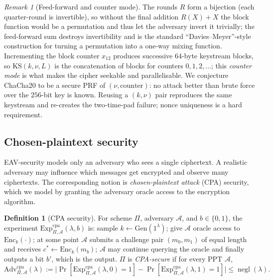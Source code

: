 \documentclass[11pt,a4paper]{article}
\theoremstyle{definition}
\newtheorem{definition}[theorem]{Definition}
\theoremstyle{remark}
\newtheorem{remark}[theorem]{Remark}
\DeclareMathOperator{\negl}{negl}
\begin{document}
\begin{remark}[Feed-forward and counter mode]\label{symmetric:rem-chacha-design}
The rounds \(R\) form a bijection (each quarter-round is invertible), so without the final addition \(R(X) + X\) the block function would be a permutation and thus let the adversary invert it trivially; the feed-forward sum destroys invertibility and is the standard ``Davies--Meyer''-style construction for turning a permutation into a one-way mixing function. Incrementing the block counter \(x_{12}\) produces successive \(64\)-byte keystream blocks, so \(\mathrm{KS}(k,\nu,L)\) is the concatenation of blocks for counters \(0, 1, 2, \dots\); this \emph{counter mode} is what makes the cipher seekable and parallelisable. We conjecture \textsf{ChaCha20} to be a secure PRF of \((\nu, \text{counter})\): no attack better than brute force over the \(256\)-bit key is known. Reusing a \((k,\nu)\) pair reproduces the same keystream and re-creates the two-time-pad failure; nonce uniqueness is a hard requirement.
\end{remark}

\subsection{Chosen-plaintext security}

EAV-security models only an adversary who sees a single ciphertext. A realistic adversary may influence which messages get encrypted and observe many ciphertexts. The corresponding notion is \emph{chosen-plaintext attack} (CPA) security, which we model by granting the adversary oracle access to the encryption algorithm.

\begin{definition}[CPA security]\label{symmetric:def-cpa}
For scheme \(\Pi\), adversary \(\mathcal{A}\), and \(b \in \{0,1\}\), the experiment \(\mathrm{Exp}^{\mathrm{cpa}}_{\Pi,\mathcal{A}}(\lambda,b)\) is: sample \(k \leftarrow \mathrm{Gen}(1^\lambda)\); give \(\mathcal{A}\) oracle access to \(\mathrm{Enc}_k(\cdot)\); at some point \(\mathcal{A}\) submits a challenge pair \((m_0, m_1)\) of equal length and receives \(c^\ast \leftarrow \mathrm{Enc}_k(m_b)\); \(\mathcal{A}\) may continue querying the oracle and finally outputs a bit \(b'\), which is the output. \(\Pi\) is \emph{CPA-secure} if for every PPT \(\mathcal{A}\),
\[
  \mathrm{Adv}^{\mathrm{cpa}}_{\Pi,\mathcal{A}}(\lambda) := \bigl|\Pr[\mathrm{Exp}^{\mathrm{cpa}}_{\Pi,\mathcal{A}}(\lambda,0)=1] - \Pr[\mathrm{Exp}^{\mathrm{cpa}}_{\Pi,\mathcal{A}}(\lambda,1)=1]\bigr| \le \negl(\lambda).
\]
\end{definition}
\end{document}
